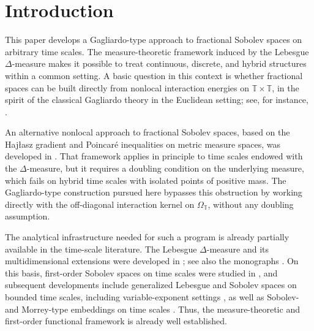 \documentclass[11pt,a4paper]{article}
\numberwithin{equation}{section}
\theoremstyle{definition}
\newcommand{\T}{\mathbb{T}}
\begin{document}
\section{Introduction}
\label{sec:intro-framework}

This paper develops a Gagliardo-type approach to fractional Sobolev spaces on arbitrary time scales. The measure-theoretic framework induced by the Lebesgue $\Delta$-measure makes it possible to treat continuous, discrete, and hybrid structures within a common setting. A basic question in this context is whether fractional spaces can be built directly from nonlocal interaction energies on $\T\times\T$, in the spirit of the classical Gagliardo theory in the Euclidean setting; see, for instance, \cite{AdamsFournier2003,DiNezzaPalatucciValdinoci2012,MolicaBisciRadulescuServadei2016}.

An alternative nonlocal approach to fractional Sobolev spaces,
based on the Haj\l{}asz gradient and Poincar\'e inequalities on
metric measure spaces, was developed in
\cite{HajlaszKoskela2000}. That framework applies in principle
to time scales endowed with the $\Delta$-measure, but it requires
a doubling condition on the underlying measure, which fails on
hybrid time scales with isolated points of positive mass. The
Gagliardo-type construction pursued here bypasses this obstruction
by working directly with the off-diagonal interaction kernel on
$\Omega_\T$, without any doubling assumption.

The analytical infrastructure needed for such a program is already partially available in the time-scale literature. The Lebesgue $\Delta$-measure and its multidimensional extensions were developed in \cite{BohnerGuseinov2006,CabadaVivero2006}; see also the monographs \cite{BohnerPeterson2001,BohnerPeterson2003}. On this basis, first-order Sobolev spaces on time scales were studied in \cite{AgarwalEtAl2006,SuYaoFeng2015}, and subsequent developments include generalized Lebesgue and Sobolev spaces on bounded time scales, including variable-exponent settings \cite{SkrzypekSzymanskaDebowska2019}, as well as Sobolev- and Morrey-type embeddings on time scales \cite{ZhangMengLiu2018}. Thus, the measure-theoretic and first-order functional framework is already well established.
\end{document}
